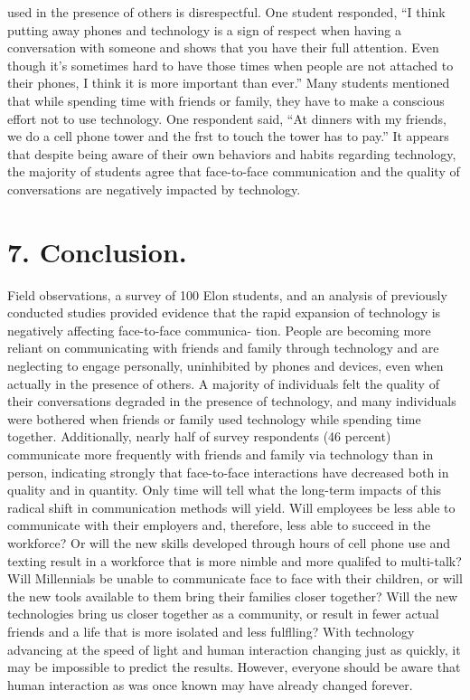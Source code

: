 \documentclass[11pt]{article} %
\begin{document}
used in the presence of others is disrespectful. One student responded, “I think putting away phones and 
technology is a sign of respect when having a conversation with someone and shows that you have their 
full attention. Even though it’s sometimes hard to have those times when people are not attached to their 
phones, I think it is more important than ever.” Many students mentioned that while spending time with friends 
or family, they have to make a conscious effort not to use technology. One respondent said, “At dinners with 
my friends, we do a cell phone tower and the frst to touch the tower has to pay.” It appears that despite being 
aware of their own behaviors and habits regarding technology, the majority of students agree that face-to-face 
communication and the quality of conversations are negatively impacted by technology.

\section{7. Conclusion.}
Field observations, a survey of 100 Elon students, and an analysis of previously conducted studies 
provided evidence that the rapid expansion of technology is negatively affecting face-to-face communica-
tion. People are becoming more reliant on communicating with friends and family through technology and are 
neglecting to engage personally, uninhibited by phones and devices, even when actually in the presence of 
others. A majority of individuals felt the quality of their conversations degraded in the presence of technology, 
and many individuals were bothered when friends or family used technology while spending time together. 
Additionally, nearly half of survey respondents (46 percent) communicate more frequently with friends and family 
via technology than in person, indicating strongly that face-to-face interactions have decreased both in quality 
and in quantity.
Only time will tell what the long-term impacts of this radical shift in communication methods will yield. 
Will employees be less able to communicate with their employers and, therefore, less able to succeed in the workforce? Or will the new skills developed through hours of cell phone use and texting result in a workforce 
that is more nimble and more qualifed to multi-talk? Will Millennials be unable to communicate face to face 
with their children, or will the new tools available to them bring their families closer together? Will the new 
technologies bring us closer together as a community, or result in fewer actual friends and a life that is more 
isolated and less fulflling? With technology advancing at the speed of light and human interaction changing 
just as quickly, it may be impossible to predict the results. However, everyone should be aware that human 
interaction as was once known may have already changed forever.
\end{document}
